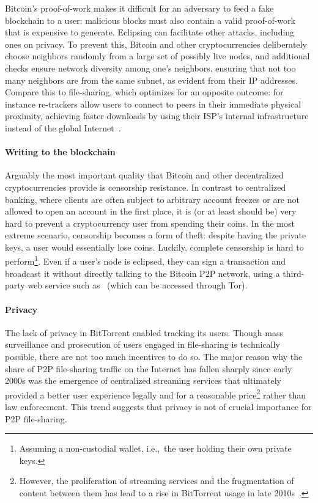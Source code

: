 Bitcoin's proof-of-work makes it difficult for an adversary to feed a fake blockchain to a user: malicious blocks must also contain a valid proof-of-work that is expensive to generate.
Eclipsing can facilitate other attacks, including ones on privacy.
To prevent this, Bitcoin and other cryptocurrencies deliberately choose neighbors randomly from a large set of possibly live nodes, and additional checks ensure network diversity among one's neighbors, ensuring that not too many neighbors are from the same subnet, as evident from their IP addresses.
Compare this to file-sharing, which optimizes for an opposite outcome: for instance re-trackers allow users to connect to peers in their immediate physical proximity, achieving faster downloads by using their ISP's internal infrastructure instead of the global Internet~\cite{Yoshida2012,Wang2012}.

\paragraph{Writing to the blockchain}
Arguably the most important quality that Bitcoin and other decentralized cryptocurrencies provide is censorship resistance.
In contrast to centralized banking, where clients are often subject to arbitrary account freezes or are not allowed to open an account in the first place, it is (or at least should be) very hard to prevent a cryptocurrency user from spending their coins.
In the most extreme scenario, censorship becomes a form of theft: despite having the private keys, a user would essentially lose coins.
Luckily, complete censorship is hard to perform\footnote{Assuming a non-custodial wallet, i.e.,~the user holding their own private keys.}.
Even if a user's node is eclipsed, they can sign a transaction and broadcast it without directly talking to the Bitcoin P2P network, using a third-party web service such as~\cite{Blockstream} (which can be accessed through Tor).

\paragraph{Privacy}
The lack of privacy in BitTorrent enabled tracking its users.
Though mass surveillance and prosecution of users engaged in file-sharing is technically possible, there are not too much incentives to do so.
The major reason why the share of P2P file-sharing traffic on the Internet has fallen sharply since early 2000s was the emergence of centralized streaming services that ultimately provided a better user experience legally and for a reasonable price\footnote{However, the proliferation of streaming services and the fragmentation of content between them has lead to a rise in BitTorrent usage in late 2010s~\cite{Bode2018}.} rather than law enforcement.
This trend suggests that privacy is not of crucial importance for P2P file-sharing.

